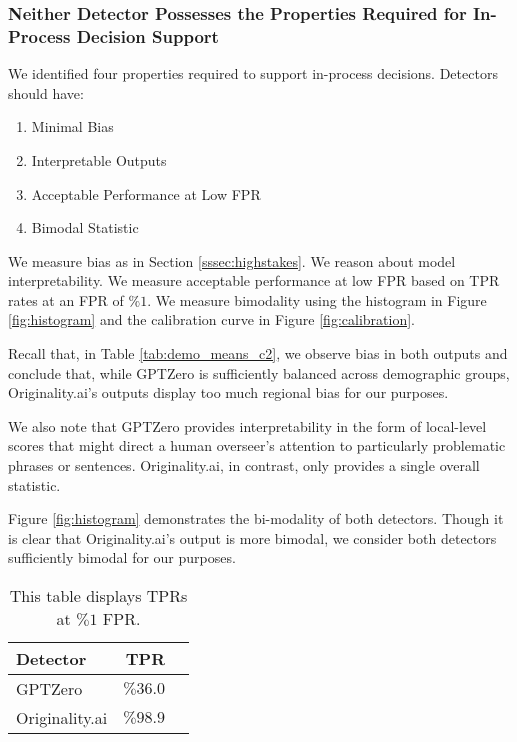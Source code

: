 \subsubsection{Neither Detector Possesses the Properties Required for In-Process Decision Support}
We identified four properties required to support in-process decisions. Detectors should have:

\begin{enumerate}
    \item Minimal Bias
    \item Interpretable Outputs
    \item Acceptable Performance at Low FPR
    \item Bimodal Statistic
\end{enumerate}

We measure bias as in Section \ref{sssec:highstakes}. We reason about model interpretability. We measure acceptable performance at low FPR based on TPR rates at an FPR of $\%1$. We measure bimodality using the histogram in Figure \ref{fig:histogram} and the calibration curve in Figure \ref{fig:calibration}.

Recall that, in Table \ref{tab:demo_means_c2}, we observe bias in both outputs and conclude that, while GPTZero is sufficiently balanced across demographic groups, Originality.ai's outputs display too much regional bias for our purposes. 

We also note that GPTZero provides interpretability in the form of local-level scores that might direct a human overseer's attention to particularly problematic phrases or sentences. Originality.ai, in contrast, only provides a single overall statistic. 

Figure \ref{fig:histogram} demonstrates the bi-modality of both detectors. Though it is clear that Originality.ai's output is more bimodal, we consider both detectors sufficiently bimodal for our purposes.

\begin{table*}[htbp]
  \centering
  \caption{This table displays TPRs at $\%1$ FPR.}
  \label{tab:tprs}
  \begin{tabular}{l r r}
      \toprule
      Detector & TPR \\
      \midrule
      GPTZero & $\%36.0$ \\
      Originality.ai & $\%98.9$ \\
      \bottomrule
  \end{tabular}
\end{table*}

